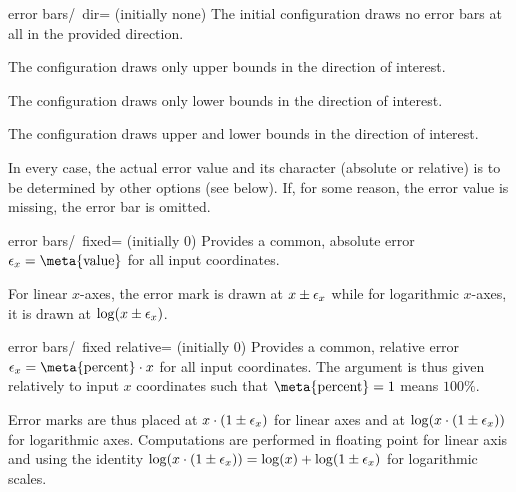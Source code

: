 {\begin{pgfplotsxykey}{error bars/\x\ dir= (initially none)}
    The initial configuration  draws no error bars at all
    in the provided direction.

    The configuration  draws only upper bounds in the
    direction of interest.

    The configuration  draws only lower bounds in the
    direction of interest.

    The configuration  draws upper and lower bounds in
    the direction of interest.

    In every case, the actual error value and its character (absolute or
    relative) is to be determined by other options (see below). If, for some
    reason, the error value is missing, the error bar is omitted.
\end{pgfplotsxykey}

\begin{pgfplotsxykey}{error bars/\x\ fixed= (initially 0)}
    Provides a common, absolute error $\pgfplotserror x=\text{\meta{value}}$
    for all input coordinates.
\begin{codeexample}[]
\end{codeexample}

    For linear $x$-axes, the error mark is drawn at $x \pm \epsilon_{x}$
    while for logarithmic $x$-axes, it is drawn at $\log( x \pm \epsilon_{x})$.
\end{pgfplotsxykey}

\begin{pgfplotsxykey}{error bars/\x\ fixed relative= (initially 0)}
    Provides a common, relative error $\pgfplotserror x = \text{\meta{percent}}
    \cdot x$ for all input coordinates. The argument  is thus
    given relatively to input $x$ coordinates such that $\text{\meta{percent}}
    = 1$ means $100\%$.

    Error marks are thus placed at $x \cdot (1 \pm \epsilon_{x})$ for
    linear axes and at $\log(x \cdot (1 \pm \epsilon_{x}))$ for logarithmic
    axes. Computations are performed in floating point for linear axis and
    using the identity $\log(x \cdot (1 \pm \epsilon_{x})) = \log(x) +
    \log( 1 \pm \epsilon_{x})$ for logarithmic scales.


\end{pgfplotsxykey}}
